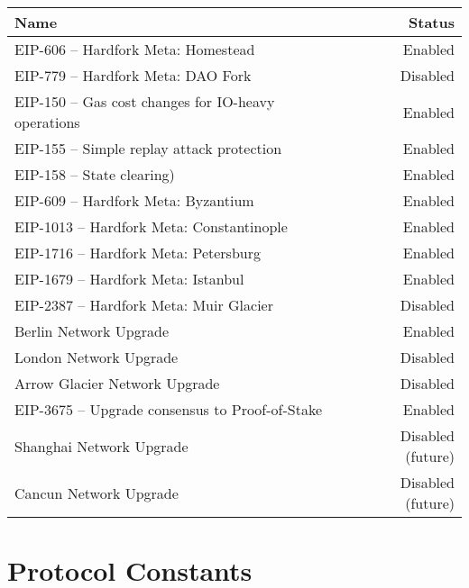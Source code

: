 \documentclass[9pt,oneside]{amsart}
\begin{document}
\begin{tabu}{l r }
\toprule
Name & Status \\
\midrule
EIP-606 -- Hardfork Meta: Homestead & \quad \quad \quad \quad \quad \quad \quad \quad \quad \quad \quad \quad \quad \quad \quad \quad \quad \quad \quad \quad \quad \quad  Enabled \\
EIP-779 -- Hardfork Meta: DAO Fork & Disabled \\
EIP-150 -- Gas cost changes for IO-heavy operations & Enabled \\
EIP-155 -- Simple replay attack protection &  Enabled \\
EIP-158 -- State clearing) & Enabled \\
EIP-609 -- Hardfork Meta: Byzantium & Enabled \\
EIP-1013 -- Hardfork Meta: Constantinople & Enabled \\
EIP-1716 -- Hardfork Meta: Petersburg & Enabled \\
EIP-1679 -- Hardfork Meta: Istanbul & Enabled \\
EIP-2387 -- Hardfork Meta: Muir Glacier & Disabled \\
Berlin Network Upgrade & Enabled \\
London Network Upgrade & Disabled \\
Arrow Glacier Network Upgrade & Disabled \\
EIP-3675 -- Upgrade consensus to Proof-of-Stake & Enabled \\
Shanghai Network Upgrade & Disabled (future) \\
Cancun Network Upgrade & Disabled (future)  \\
\bottomrule
\end{tabu}



\section{Protocol Constants}\label{sec:constants1}
\end{document}
